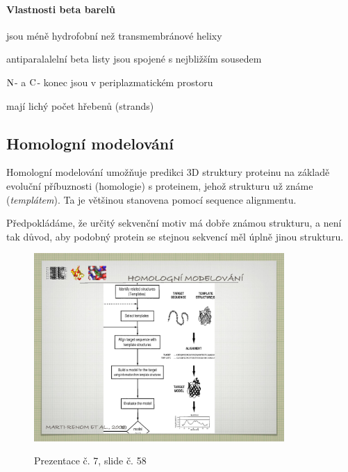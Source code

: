 \documentclass[DIV=8]{scrreprt}
\begin{document}
\paragraph{Vlastnosti beta barelů}
\begin{myItemize}[nosep]
    \item jsou méně hydrofobní než transmembránové helixy
    \item antiparalalelní beta listy jsou spojené s nejbližším sousedem
    \item \(\ce{N}\)- a \(\ce{C}\)- konec jsou v periplazmatickém prostoru
    \item mají lichý počet hřebenů (strands)
\end{myItemize}



\subsection{Homologní modelování} \label{Homologní modelování}


Homologní modelování umožňuje predikci 3D struktury proteinu na základě evoluční příbuznosti (homologie) s proteinem, jehož strukturu už známe (\emph{templátem}). Ta je většinou stanovena pomocí sequence alignmentu.

Předpokládáme, že určitý sekvenční motiv má dobře známou strukturu, a není tak důvod, aby podobný protein se stejnou sekvencí měl úplně jinou strukturu.

\begin{figure}
    \caption{Prezentace č. 7, slide č. 58}
    \includegraphics[width=0.85\textwidth]{slides-7/slide-58.jpg}
    \centering
    \label{slides-7-slide-58}
\end{figure}
\end{document}
